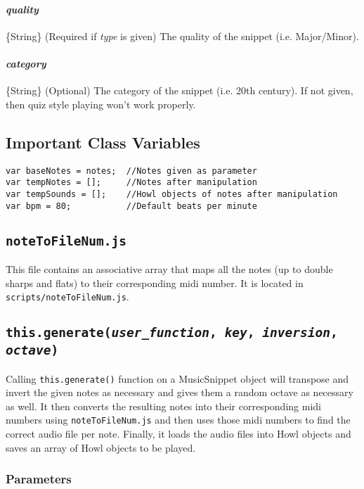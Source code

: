 \documentclass{article}
\begin{document}
\paragraph{\textit{quality}} \{String\} (Required if \textit{type} is given) The quality of the snippet (i.e. Major/Minor).
\paragraph{\textit{category}} \{String\} (Optional) The category of the snippet (i.e. 20th century). If not given, then quiz style playing won't work properly.

\subsection{Important Class Variables}
\begin{lstlisting}
var baseNotes = notes;  //Notes given as parameter
var tempNotes = [];     //Notes after manipulation  
var tempSounds = [];    //Howl objects of notes after manipulation
var bpm = 80;           //Default beats per minute
\end{lstlisting}

\subsection{\texttt{noteToFileNum.js}}
This file contains an associative array that maps all the notes (up to double sharps and flats) to their corresponding midi number. It is located in \texttt{scripts/noteToFileNum.js}.

\subsection{\texttt{this.generate(\textit{user\_function}, \textit{key}, \textit{inversion}, \textit{octave})}}
Calling \texttt{this.generate()} function on a MusicSnippet object will transpose and invert the given notes as necessary and gives them a random octave as necessary as well. It then converts the resulting notes into their corresponding midi numbers using \texttt{noteToFileNum.js} and then uses those midi numbers to find the correct audio file per note. Finally, it loads the audio files into Howl objects and saves an array of Howl objects to be played.

\subsubsection{Parameters}
\end{document}
